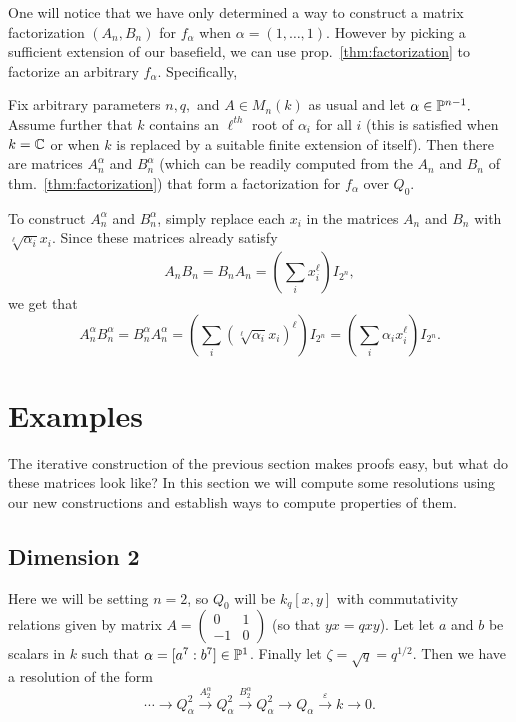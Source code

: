 \documentclass [11pt, proquest] {uwthesis}[2020/02/24]
\begin{document}
    One will notice that we have only determined a way to construct a matrix factorization $(A_n,B_n)$ for $f_\alpha$ when $\alpha=(1,\dots,1).$ However by picking a sufficient extension of our basefield, we can use prop.~\ref{thm:factorization} to factorize an arbitrary $f_\alpha$. Specifically,
    \begin{thm}\label{thm:factorization_general}
        Fix arbitrary parameters $n,q,$ and $A\in M_n(k)$ as usual and let $\alpha\in\mathbb{P}^{n-1}.$ Assume further that $k$ contains an $\ell^{th}$ root of $\alpha_i$ for all $i$ (this is satisfied when $k=\mathbb{C}$ or when $k$ is replaced by a suitable finite extension of itself). Then there are matrices $A_n^\alpha$ and $B_n^\alpha$ (which can be readily computed from the $A_n$ and $B_n$ of thm.~\ref{thm:factorization}) that form a factorization for $f_\alpha$ over $Q_0$.
    \end{thm}
    \begin{prf}
        To construct $A_n^\alpha$ and $B_n^\alpha$, simply replace each $x_i$ in the matrices $A_n$ and $B_n$ with $\sqrt[\ell]{\alpha_i}x_i$. Since these matrices already satisfy
        \[A_nB_n=B_nA_n=\left(\sum_i x_i^\ell\right)I_{2^n},\]
        we get that
        \[A_n^\alpha B_n^\alpha=B_n^\alpha A_n^\alpha=\left(\sum_i (\sqrt[\ell]{\alpha_i}x_i)^\ell\right)I_{2^n}=\left(\sum_i\alpha_ix_i^\ell\right)I_{2^n}.\]
    \end{prf}

\section{Examples}
    The iterative construction of the previous section makes proofs easy, but what do these matrices look like? In this section we will compute some resolutions using our new constructions and establish ways to compute properties of them.

\subsection{Dimension 2}\label{subsec:dim-two-factorization}
    Here we will be setting $n=2$, so $Q_0$ will be $k_q[x,y]$ with commutativity relations given by matrix $A=(\begin{smallmatrix}0 & 1\\-1 & 0\end{smallmatrix})$ (so that $yx=qxy$). Let let $a$ and $b$ be scalars in $k$ such that $\alpha=[a^7:b^7]\in\mathbb{P}^1$. Finally let $\zeta=\sqrt{q}=q^{1/2}.$ Then we have a resolution of the form 
    \[\cdots\to Q_\alpha^2\xrightarrow{A_2^\alpha}Q_\alpha^2\xrightarrow{B_2^\alpha}Q_\alpha^2\to Q_\alpha\xrightarrow{\varepsilon} k \to 0.\]
    
\end{document}

